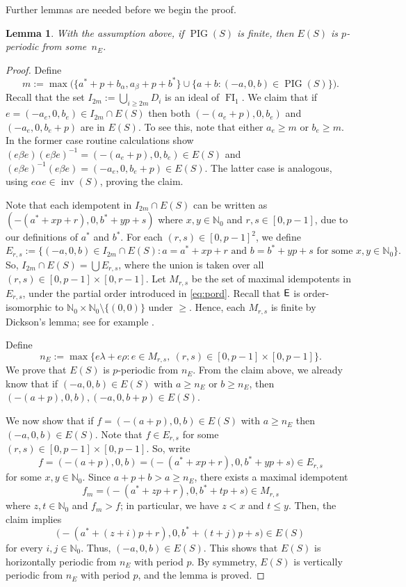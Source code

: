 \documentclass[reqno]{amsart}
\theoremstyle{plain}
\newtheorem{lem}{Lemma}[section]
\theoremstyle{definition}
\DeclareMathOperator{\inv}{inv}
\DeclareMathOperator{\PIG}{PIG}
\DeclareMathOperator{\FI}{FI}
\DeclareMathOperator{\E}{\textup{\textsf{E}}}
\numberwithin{equation}{section}
\begin{document}
Further lemmas are needed before we begin the proof.

\begin{lem}
\label{lem:PeriodicSemilattice}
With the assumption above, if $\PIG(S)$ is finite, then $E(S)$ is $p$-periodic from some~$n_{E}$.
\end{lem}

\begin{proof}
Define 
\[
m := \max\bigl(\bigl\{a^\ast+p+b_{\alpha}, a_{\beta}+p+b^\ast\bigr\}\cup \bigl\{a+b : (-a, 0, b)\in\PIG(S)\bigr\}\bigr).
\]
Recall that the set $I_{2m} := \bigcup_{i\geq 2m}D_i$ is an ideal of $\FI_1$.
 We claim that if $e = (-a_e, 0, b_e)\in I_{2m}\cap E(S)$ then both $(-(a_e+p), 0, b_e)$ and $(-a_e, 0, b_e+p)$ are in $E(S)$. To see this, note that either $a_e\geq m$ or $b_e\geq m$. 
In the former case routine calculations show 
$(e\beta e)(e\beta e)^{-1} = (-(a_e+p),0,b_e)\in E(S)$ and $(e\beta e)^{-1}(e\beta e) = (-a_e, 0, b_e+p)\in E(S)$. 
The latter case is analogous, using $e\alpha e\in \inv(S)$, proving the claim.



Note that each idempotent in $I_{2m}\cap E(S)$ can be written as $(-(a^\ast +xp +r),0, b^\ast+yp+s)$ where $x,y\in\mathbb{N}_0$ and $r,s\in[0,p-1]$, due to our definitions of $a^\ast$ and $b^\ast$. For each $(r,s)\in[0,p-1]^2$, we define 
\[
E_{r,s} := \bigl\{(-a, 0, b)\in I_{2m}\cap E(S) : a = a^\ast +xp+r \text{ and } b = b^\ast+yp+s \text{ for some } x,y\in\mathbb{N}_0\bigr\}.
\]
So, $I_{2m}\cap E(S) = \bigcup E_{r,s}$, where the union is taken over all $(r,s)\in[0,p-1]\times [0,r-1]$. 
Let $M_{r,s}$ be the set of maximal idempotents in $E_{r,s}$, under the partial order introduced in \eqref{eq:pord}.
Recall that $\E$ is order-isomorphic to $\mathbb{N}_0\times\mathbb{N}_0\setminus\{(0,0)\}$
under $\geq$. Hence, each $M_{r,s}$ is finite by Dickson's lemma; see for example
\cite[Corollary 6.12]{Diekert16}.

Define 
\[
n_E := \max \bigl\{e\lambda + e\rho : e\in M_{r,s},\ (r,s)\in [0,p-1]\times [0,p-1]\bigr\}.
\]
We prove that $E(S)$ is $p$-periodic from $n_{E}$. From the claim above, we already know that if $(-a, 0, b)\in E(S)$ with $a\geq n_{E}$ or $b\geq n_E$, then $(-(a+p), 0, b), (-a, 0, b+p)\in E(S)$.

We now show that if $f = (-(a+p), 0, b)\in E(S)$ with $a\geq n_E$ then $(-a, 0, b)\in E(S)$. Note that $f \in E_{r,s}$ for some $(r,s)\in [0, p-1]\times [0,p-1]$. So, write 
\[
f = (-(a+p), 0, b) = \bigl(-(a^\ast + xp +r), 0, b^\ast +yp+s\bigr)\in E_{r,s}
\]
for some $x, y\in \mathbb{N}_0$. Since $a+p+b > a \geq n_E$, there exists a maximal idempotent 
\[
f_m = \bigl(-(a^\ast +zp+r), 0, b^\ast + tp +s \bigr)\in M_{r,s}
\]
where $z, t\in \mathbb{N}_0$ and $f_m > f$; in particular, we have $z < x$ and $t\leq y$. Then, the claim implies 
\[
\bigl(-(a^\ast + (z+i)p + r), 0, b^\ast + (t+j)p + s\bigr)\in E(S)
\]
for every $i, j\in\mathbb{N}_0$. Thus, $(-a, 0, b)\in E(S)$. This shows that $E(S)$ is horizontally periodic from $n_E$ with period $p$. By symmetry, $E(S)$ is vertically periodic from $n_E$ with period $p$, and the lemma is proved.
\end{proof}
\end{document}

